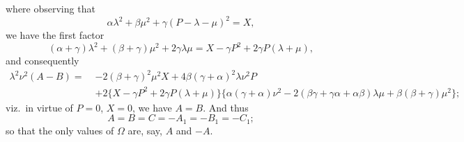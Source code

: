 \documentclass[11pt,a4paper]{article}
\begin{document}
where observing that
\[
\alpha\lambda^{2} + \beta\mu^{2} + \gamma(P - \lambda - \mu)^{2} = X,
\]
we have the first factor
\[
(\alpha + \gamma)\lambda^{2} + (\beta + \gamma)\mu^{2} + 2\gamma\lambda\mu = X - \gamma P^{2} + 2\gamma P(\lambda + \mu),
\]
and consequently
\[
\begin{aligned}
\lambda^{2}\nu^{2}(A - B) =\;& -2(\beta + \gamma)^{2}\mu^{2} X + 4\beta(\gamma + \alpha)^{2}\lambda\nu^{2} P \\
& + 2\{X - \gamma P^{2} + 2\gamma P(\lambda + \mu)\}\{\alpha(\gamma + \alpha)\nu^{2} - 2(\beta\gamma + \gamma\alpha + \alpha\beta)\lambda\mu + \beta(\beta + \gamma)\mu^{2}\};
\end{aligned}
\]
viz.\ in virtue of $P = 0$, $X = 0$, we have $A = B$. And thus
\[
A = B = C = -A_{1} = -B_{1} = -C_{1};
\]
so that the only values of $\Omega$ are, say, $A$ and $-A$.

\newpage

\end{document}
